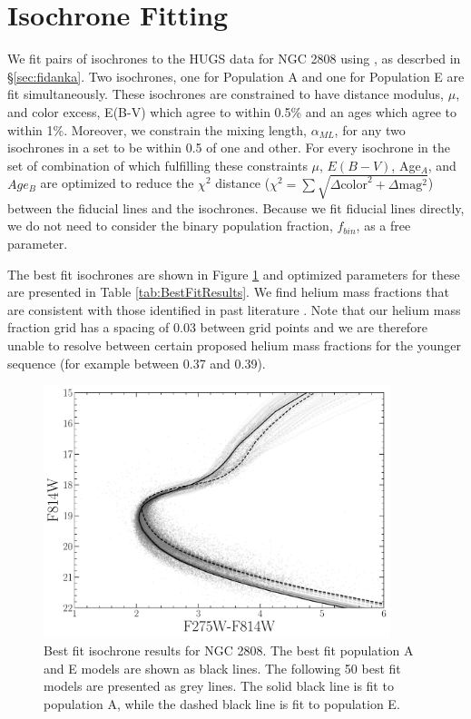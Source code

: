\section{Isochrone Fitting}\label{sec:isoFit}
We fit pairs of isochrones to the HUGS data for NGC 2808 using \fidanka, as
descrbed in \S \ref{sec:fidanka}. Two isochrones, one for Population A and one
for Population E are fit simultaneously. These isochrones are constrained to
have distance modulus, $\mu$, and color excess, E(B-V) which agree to within
0.5\% and an ages which agree to within 1\%. Moreover, we constrain the mixing length, $\alpha_{ML}$, for any two
isochrones in a set to be within 0.5 of one and other. For every isochrone in
the set of combination of which fulfilling these constraints $\mu$, $E(B-V)$,
Age$_{A}$, and $Age_{B}$ are optimized to reduce the $\chi^{2}$ distance
($\chi^{2} = \sum\sqrt{\Delta \text{color}^{2} + \Delta \text{mag} ^{2}}$)
between the fiducial lines and the isochrones. Because we fit fiducial lines
directly, we do not need to consider the binary population fraction, $f_{bin}$,
as a free parameter.

The best fit isochrones are shown in Figure \ref{fig:BestFitResults} and
optimized parameters for these are presented in Table \ref{tab:BestFitResults}.
We find helium mass fractions that are consistent with those identified in past
literature \citep[e.g.][]{Milone2015}. Note that our helium mass fraction grid
has a spacing of 0.03 between grid points and we are therefore unable to
resolve between certain proposed helium mass fractions for the younger sequence
(for example between 0.37 and 0.39).

\begin{figure}
  \centering
  \includegraphics[width=0.9\textwidth]{src/figures/BestFitResults.pdf}
  \caption{Best fit isochrone results for NGC 2808. The best fit population A
  and E models are shown as black lines. The following 50 best fit models are
  presented as grey lines. The solid black line is fit to population A, while
  the dashed black line is fit to population E.}
  \label{fig:BestFitResults}
\end{figure}

